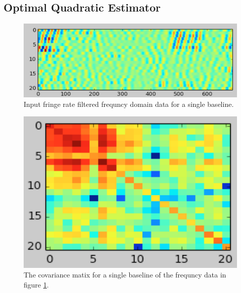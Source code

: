 \documentclass[twocolumn,numberedappendix]{emulateapj}
\begin{document}
\subsection{Optimal Quadratic Estimator}

\begin{figure}[h!]\centering
\includegraphics[width=2\columnwidth, height=.8\columnwidth]{plots/x_example.png}
\caption{Input fringe rate filtered frequncy domain data for a single baseline.}
\label{fig:x_example}
\end{figure}

\begin{figure}[h!]\centering
\includegraphics[width=\columnwidth, height=.8\columnwidth]{plots/C_example.png}
\caption{The covariance matix for a single baseline of the frequncy data in
figure \ref{fig:x_example}.} 
\label{fig:C_example}
\end{figure}
\end{document}
